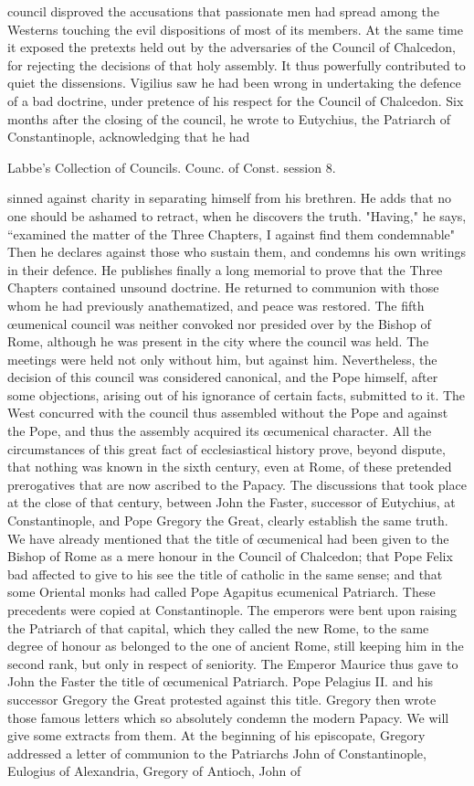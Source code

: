 council disproved the accusations that passionate men had spread among the Westerns touching the evil dispositions of most of its members. At the same time it exposed the pretexts held out by the adversaries of the Council of Chalcedon, for rejecting the decisions of that holy assembly. It thus powerfully contributed to quiet the dissensions. Vigilius saw he had been wrong in undertaking the defence of a bad doctrine, under pretence of his respect for the Council of Chalcedon. Six months after the closing of the council, he wrote to Eutychius, the Patriarch of Constantinople, acknowledging that he had

Labbe’s Collection of Councils. Counc. of Const. session 8.

sinned against charity in separating himself from his brethren. He adds that no one should be ashamed to retract, when he discovers the truth. "Having," he says, “examined the matter of the Three Chapters, I against find them condemnable" Then he declares against those who sustain them, and condemns his own writings in their defence. He publishes finally a long memorial to prove that the Three Chapters contained unsound doctrine. He returned to communion with those whom he had previously anathematized, and peace was restored. The fifth œumenical council was neither convoked nor presided over by the Bishop of Rome, although he was present in the city where the council was held. The meetings were held not only without him, but against him. Nevertheless, the decision of this council was considered canonical, and the Pope himself, after some objections, arising out of his ignorance of certain facts, submitted to it. The West concurred with the council thus assembled without the Pope and against the Pope, and thus the assembly acquired its œcumenical character. All the circumstances of this great fact of ecclesiastical history prove, beyond dispute, that nothing was known in the sixth century, even at Rome, of these pretended prerogatives that are now ascribed to the Papacy. The discussions that took place at the close of that century, between John the Faster, successor of Eutychius, at Constantinople, and Pope Gregory the Great, clearly establish the same truth. We have already mentioned that the title of œcumenical had been given to the Bishop of Rome as a mere honour in the Council of Chalcedon; that Pope Felix bad affected to give to his see the title of catholic in the same sense; and that some Oriental monks had called Pope Agapitus ecumenical Patriarch. These precedents were copied at Constantinople. The emperors were bent upon raising the Patriarch of that capital, which they called the new Rome, to the same degree of honour as belonged to the one of ancient Rome, still keeping him in the second rank, but only in respect of seniority. The Emperor Maurice thus gave to John the Faster the title of œcumenical Patriarch. Pope Pelagius II. and his successor Gregory the Great protested against this title. Gregory then wrote those famous letters which so absolutely condemn the modern Papacy. We will give some extracts from them. At the beginning of his episcopate, Gregory addressed a letter of communion to the Patriarchs John of Constantinople, Eulogius of Alexandria, Gregory of Antioch, John of 